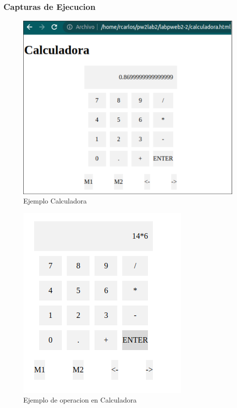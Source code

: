 \documentclass{article}
\begin{document}
	\subsubsection{Capturas de Ejecucion}
	\begin{figure}[H]
	    \centering
	    \includegraphics[scale=0.5]{img/exe/ejemplo-calcu.png}
	    \caption{Ejemplo Calculadora}
	\end{figure}
	\begin{figure}[H]
	    \centering
	    \includegraphics[scale=0.5]{img/exe/ejemplo1-operacion.png}
	    \caption{Ejemplo de operacion en Calculadora}
	\end{figure}
\end{document}
